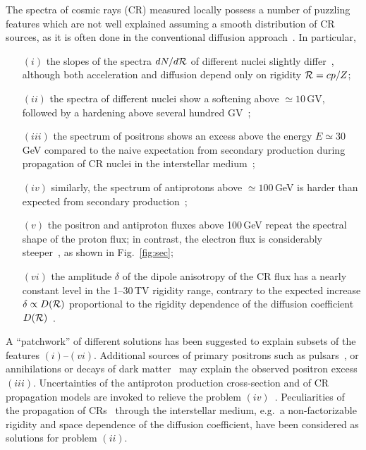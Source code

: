 \documentclass[prd,aps,twocolumn]{revtex4}
\def\R{{\cal R}}
\begin{document}
The spectra of cosmic rays (CR) measured locally possess a number of 
puzzling features which are not well explained assuming a smooth distribution 
of CR sources, as it is often done in the conventional diffusion 
approach~\cite{SM}. In particular, 
%
\begin{enumerate}
\item[$(i)$] 
the slopes of the spectra $dN/d\R$ of different nuclei slightly 
differ~\cite{PAMELA_pHe,AMS02_p,AMS02_He}, although both acceleration 
and diffusion depend only on rigidity $\R=cp/Z$;
\item[$(ii)$]  
the spectra of different nuclei show a softening above $\simeq 10$\,GV, 
followed by a hardening above several hundred GV~\cite{PAMELA_pHe,AMS02_p,AMS02_He,CREAM,CREAM_nuclei,CREAMIII};
\item[$(iii)$]  
the spectrum of positrons shows an excess above the energy $E\simeq 30$\,GeV 
compared to the naive expectation from secondary production during propagation 
of CR nuclei in the interstellar medium~\cite{PAMELA_pos,AMS02_pos};
\item[$(iv)$]  
similarly, the spectrum of antiprotons above $\simeq 100$\,GeV is 
harder than expected from secondary production~\cite{PAMELA_pbar,AMS02_pbar};
\item[$(v)$]  
the positron and antiproton fluxes above 100\,GeV repeat the 
spectral shape of the proton flux; in contrast, the electron flux
is considerably steeper~\cite{AMS02_pos,AMS02_pbar}, as shown in 
Fig.~\ref{fig:sec};
\item[$(vi)$]  
the amplitude $\delta$ of the dipole anisotropy 
of the CR flux has a nearly constant level in the 1--30\,TV rigidity range, 
contrary to the expected increase $\delta\propto D(\R)$ proportional to the 
rigidity dependence of the diffusion coefficient $D(\R)$~\cite{aniso}. 
\end{enumerate}
%
A ``patchwork'' of different solutions has been suggested to explain subsets
of the features $(i)$--$(vi)$. Additional sources of primary positrons  such 
as pulsars~\cite{pulsars}, or annihilations or decays of dark matter~\cite{dm} 
may 
explain the observed positron excess $(iii)$. Uncertainties of the antiproton 
production cross-section and of CR propagation models are invoked to relieve 
the problem $(iv)$~\cite{antip}. Peculiarities of the propagation of 
CRs~\cite{prop} through the interstellar medium, e.g.\ a non-factorizable
rigidity and space  dependence of the diffusion coefficient, have been 
considered as solutions for problem $(ii)$. 
\end{document}
